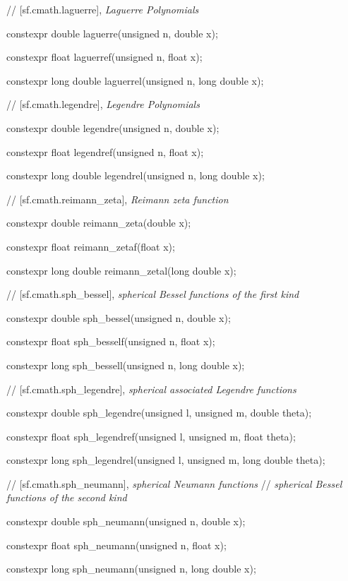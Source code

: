\documentclass[prd,twocolumn,amsmath,amssymb,nofootinbib,eqsecnum]{revtex4-1}
\newcommand{\highlight}[1]{{\color{red} #1}}
\newcommand{\bigund}{{\Huge{\_}}}
\begin{document}
{\vspace{2ex}
// [sf.cmath.laguerre], {\it Laguerre Polynomials}
\vspace{2ex}

\highlight{constexpr} double laguerre(unsigned n, double x);
	
\highlight{constexpr} float laguerref(unsigned n, float x);
	
\highlight{constexpr} long double laguerrel(unsigned n, long double x);

\vspace{2ex}
// [sf.cmath.legendre], {\it Legendre Polynomials}
\vspace{2ex}

\highlight{constexpr} double legendre(unsigned n, double x);
	
\highlight{constexpr} float legendref(unsigned n, float x);
	
\highlight{constexpr} long double legendrel(unsigned n, long double x);

\vspace{2ex}
// [sf.cmath.reimann{\bigund}zeta], {\it Reimann zeta function}
\vspace{2ex}

\highlight{constexpr} double reimann\_zeta(double x);
	
\highlight{constexpr} float reimann\_zetaf(float x);
	
\highlight{constexpr} long double reimann\_zetal(long double x);

\vspace{2ex}
// [sf.cmath.sph{\bigund}bessel], {\it spherical Bessel functions of the first kind}
\vspace{2ex}

\highlight{constexpr} double sph\_bessel(unsigned n, double x);
	
\highlight{constexpr} float sph\_besself(unsigned n, float x);
	
\highlight{constexpr} long sph\_bessell(unsigned n, long double x);

\vspace{2ex}
// [sf.cmath.sph{\bigund}legendre], {\it spherical associated Legendre functions}
\vspace{2ex}

\highlight{constexpr} double sph\_legendre(unsigned l, unsigned m, double theta);
	
\highlight{constexpr} float sph\_legendref(unsigned l, unsigned m, float theta);
	
\highlight{constexpr} long sph\_legendrel(unsigned l, unsigned m, long double theta);

\vspace{2ex}
// [sf.cmath.sph{\bigund}neumann], {\it spherical Neumann functions} \newline
// {\it spherical Bessel functions of the second kind}

\highlight{constexpr} double sph\_neumann(unsigned n, double x);
	
\highlight{constexpr} float sph\_neumann(unsigned n, float x);
	
\highlight{constexpr} long sph\_neumann(unsigned n, long double x);

}
\end{document}

